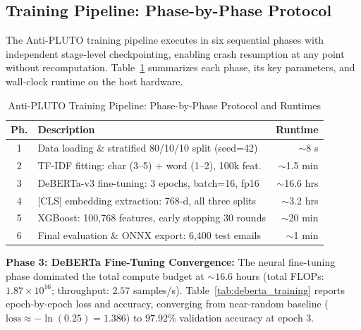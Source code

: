 \documentclass[journal]{IEEEtran}
\begin{document}
\subsection{Training Pipeline: Phase-by-Phase Protocol}
The Anti-PLUTO training pipeline executes in six sequential phases with independent stage-level checkpointing, enabling crash resumption at any point without recomputation. Table~\ref{tab:training_phases} summarizes each phase, its key parameters, and wall-clock runtime on the host hardware.

\begin{table}[!htbp]
\caption{Anti-PLUTO Training Pipeline: Phase-by-Phase Protocol and Runtimes}
\label{tab:training_phases}
\centering
\begin{tabularx}{\columnwidth}{c X r}
\toprule
\textbf{Ph.} & \textbf{Description} & \textbf{Runtime} \\
\midrule
1 & Data loading \& stratified 80/10/10 split (seed=42) & $\sim$8 s \\
2 & TF-IDF fitting: char (3--5) + word (1--2), 100k feat. & $\sim$1.5 min \\
3 & DeBERTa-v3 fine-tuning: 3 epochs, batch=16, fp16 & $\sim$16.6 hrs \\
4 & [CLS] embedding extraction: 768-d, all three splits & $\sim$3.2 hrs \\
5 & XGBoost: 100,768 features, early stopping 30 rounds & $\sim$20 min \\
6 & Final evaluation \& ONNX export: 6,400 test emails & $\sim$1 min \\
\bottomrule
\end{tabularx}
\end{table}

\textbf{Phase 3: DeBERTa Fine-Tuning Convergence:} The neural fine-tuning phase dominated the total compute budget at $\sim 16.6$ hours (total FLOPs: $1.87 \times 10^{16}$; throughput: $2.57$ samples/s). Table~\ref{tab:deberta_training} reports epoch-by-epoch loss and accuracy, converging from near-random baseline ($\text{loss} \approx -\ln(0.25) = 1.386$) to $97.92\%$ validation accuracy at epoch 3.

\begin{table}[!htbp]
\caption{DeBERTa-v3-small Fine-Tuning Convergence on 51,200 Training Emails}
\label{tab:deberta_training}
\centering
{}
\end{table}
\end{document}
